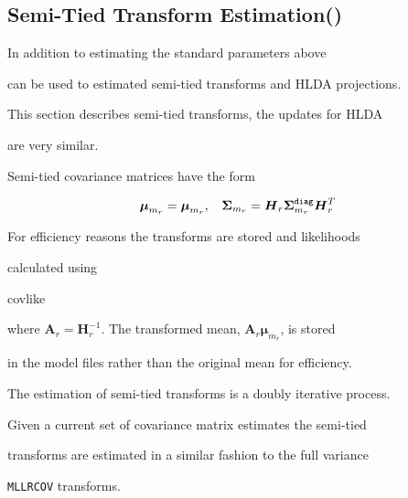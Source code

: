 \subsection{Semi-Tied Transform Estimation()}


In addition to estimating the standard parameters above 


can be used to estimated semi-tied transforms and HLDA projections.


This section describes semi-tied transforms,  the updates for HLDA


are very similar. 





Semi-tied covariance matrices have the form


\begin{eqnarray}


{\bm{\mu}}_{m_r} = \bm{\mu}_{m_r}, \:\:\:\: 


{\bm{\Sigma}}_{m_r} = {\bm H}_r{\bm{\Sigma}}^{\tt diag}_{m_r}{\bm H}_r^T


\end{eqnarray}


For efficiency reasons the transforms are stored and likelihoods


calculated using


 {covlike}


where $\bm{A}_r=\bm{H}_r^{-1}$. The transformed mean, $\bm{A}_{r}\bm{\mu}_{m_r}$, is stored


in the model files rather than the original mean for efficiency.





The estimation of semi-tied transforms is a doubly iterative process. 


Given a current set of covariance matrix estimates the semi-tied 


transforms are estimated in a similar fashion to the full variance


{\tt MLLRCOV} transforms.


